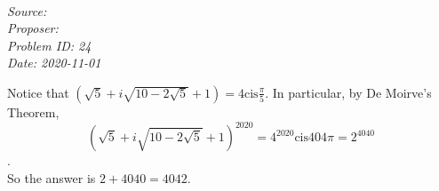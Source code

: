 \SSbreak\\
\emph{Source: \Cop}\\
\emph{Proposer: \Ppi}\\
\emph{Problem ID: 24}\\
\emph{Date: 2020-11-01}\\
\SSbreak

\bigskip

\begin{solution}\hfil\medskip
    
    Notice that $ \left ( \sqrt{5} + i\sqrt{10-2\sqrt{5}} + 1 \right ) = 4 \mathrm{cis} \frac{\pi}{5}$. 
    In particular, by De Moirve's Theorem, 
    $$\left ( \sqrt{5} + i\sqrt{10-2\sqrt{5}} + 1 \right )^{2020} = 4^{2020} \mathrm{cis} {404\pi} = 2^{4040}$$.\\

    So the answer is $2 + 4040 = \boxed{4042}$. 
\end{solution}\bigskip